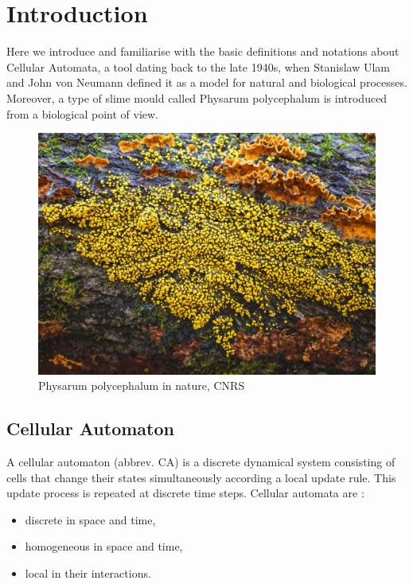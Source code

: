 \chapter{Introduction}

Here we introduce and familiarise with the basic definitions and notations about Cellular Automata, a tool dating back to the late 1940s, when Stanislaw Ulam and John von Neumann defined it as a model for natural and biological processes. Moreover, a type of slime mould called Physarum polycephalum is introduced from a biological point of view.

\begin{figure}[H]
  \centering
    \includegraphics[width=1\textwidth]{nature_1}%
    
  \caption{Physarum polycephalum in nature, \textcopyright CNRS}
  \label{fig:PhysarumCNRS2880x1500}
\end{figure}

\section{Cellular Automaton}
\label{ca}

A cellular automaton (abbrev. CA) is a discrete dynamical system consisting of cells that change their states simultaneously according a local update rule. This update process is repeated at discrete time steps. Cellular automata are \cite{canotes}:

\begin{itemize}
	\item discrete in space and time,
	\item homogeneous in space and time,
	\item local in their interactions.
\end{itemize}


